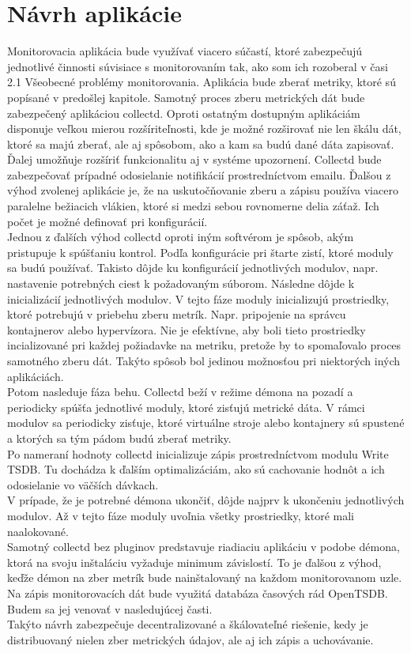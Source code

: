 \documentclass[11pt,final,oneside]{fithesis}
\begin{document}
\section{Návrh aplikácie}
Monitorovacia aplikácia bude využívať viacero súčastí, ktoré zabezpečujú jednotlivé činnosti súvisiace s monitorovaním tak, ako som ich rozoberal v časi 2.1 Všeobecné problémy monitorovania.
Aplikácia bude zberať metriky, ktoré sú popísané v predošlej kapitole. Samotný proces zberu metrických dát bude zabezpečený aplikáciou collectd. Oproti ostatným dostupným aplikáciám disponuje
veľkou mierou rozšíriteľnosti, kde je možné rozširovať nie len škálu dát, ktoré sa majú zberať, ale aj spôsobom, ako a kam sa budú dané dáta zapisovať. Ďalej umožňuje rozšíriť funkcionalitu
aj v systéme upozornení. Collectd bude zabezpečovať prípadné odosielanie notifikácií prostredníctvom emailu. Ďalšou z výhod zvolenej aplikácie je, že na uskutočňovanie zberu a zápisu používa viacero
paralelne bežiacich vlákien, ktoré si medzi sebou rovnomerne delia záťaž. Ich počet je možné definovať pri konfigurácií. 
\\Jednou z ďalších výhod collectd oproti iným softvérom je spôsob, akým pristupuje k spúšťaniu kontrol. Podľa konfigurácie pri štarte zistí, ktoré moduly sa budú používať. Takisto dôjde ku konfigurácií 
jednotlivých modulov, napr. nastavenie potrebných ciest k požadovaným súborom. Následne dôjde k inicializácií jednotlivých modulov. V tejto fáze moduly inicializujú prostriedky, ktoré potrebujú v priebehu 
zberu metrík. Napr. pripojenie na správcu kontajnerov alebo hypervízora. Nie je efektívne, aby boli tieto prostriedky incializované pri
každej požiadavke na metriku, pretože by to spomaľovalo proces samotného zberu dát. Takýto spôsob bol jedinou možnosťou pri niektorých iných aplikáciách.
\\Potom nasleduje fáza behu. Collectd beží v režime démona na pozadí a periodicky spúšťa jednotlivé moduly, ktoré zisťujú metrické dáta. 
V rámci modulov sa periodicky zisťuje, ktoré virtuálne stroje alebo kontajnery sú spustené a ktorých sa tým pádom budú zberať metriky. 
\\Po nameraní hodnoty collectd inicializuje zápis prostredníctvom modulu Write TSDB. Tu dochádza k ďalším optimalizáciám, ako sú cachovanie
hodnôt a ich odosielanie vo väčších dávkach.
\\V prípade, že je potrebné démona ukončiť, dôjde najprv k ukončeniu jednotlivých modulov. Až v tejto fáze moduly uvoľnia všetky prostriedky, ktoré mali naalokované.
\\Samotný collectd bez pluginov predstavuje riadiaciu aplikáciu v podobe démona, ktorá na svoju inštaláciu vyžaduje minimum závislostí. To je ďalšou z výhod, keďže 
démon na zber metrík bude nainštalovaný na každom monitorovanom uzle.
\\Na zápis monitorovacích dát bude využitá databáza časových rád OpenTSDB. Budem sa jej venovať v nasledujúcej časti.
\\Takýto návrh zabezpečuje decentralizované a škálovateľné riešenie, kedy je distribuovaný nielen zber metrických údajov, ale aj ich zápis a uchovávanie.
\end{document}
